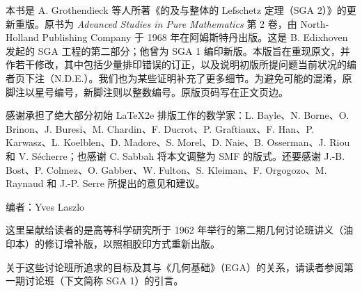 本书是 A. Grothendieck 等人所著《的及与整体的 Lefschetz 定理（SGA 2）》的更新重版。原书为 \textit{Advanced Studies in Pure Mathematics} 第 2 卷，由 North-Holland Publishing Company 于 1968 年在阿姆斯特丹出版。这是 B. Edixhoven 发起的 SGA 工程的第二部分；他曾为 SGA 1 编印新版。本版旨在重现原文，并作若干修改，其中包括少量排印错误的订正，以及说明初版所提问题当前状况的编者页下注（N.D.E.）。我们也为某些证明补充了更多细节。为避免可能的混淆，原脚注以星号编号，新脚注则以整数编号。原版页码写在正文页边。

感谢承担了绝大部分初始 \LaTeX2e{} 排版工作的数学家：L. Bayle、N. Borne、O. Brinon、J. Buresi、M. Chardin、F. Ducrot、P. Graftiaux、F. Han、P. Karwasz、L. Koelblen、D. Madore、S. Morel、D. Naie、B. Osserman、J. Riou 和 V. Sécherre；也感谢 C. Sabbah 将本文调整为 SMF 的版式。还要感谢 J.-B. Bost、P. Colmez、O. Gabber、W. Fulton、S. Kleiman、F. Orgogozo、M. Raynaud 和 J.-P. Serre 所提出的意见和建议。

\begin{flushright}编者：Yves Laszlo\end{flushright}


这里呈献给读者的是高等科学研究所于 1962 年举行的第二期几何讨论班讲义（油印本）的修订增补版，以照相胶印方式重新出版。

关于这些讨论班所追求的目标及其与《几何基础》（EGA）的关系，请读者参阅第一期讨论班（下文简称 SGA 1）的引言。

